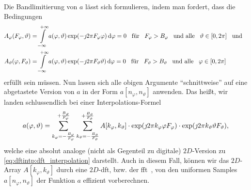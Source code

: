 Die Bandlimitierung von $a$ l\"asst sich formulieren, indem man fordert, dass die Bedingungen
\begin{align}
    A_{\varphi}(F_\varphi, \vartheta) 
    &= {\int\limits_{-\infty}^{+\infty}{
        a(\varphi, \vartheta) \exp(-\jmath 2 \pi F_\varphi \varphi)
    }\,\mathrm{d}{\varphi}} = 0 
    {\hspace{3mm} \text{f\"ur} \hspace{3mm}} F_\varphi > B_\varphi {\hspace{3mm} \text{und alle} \hspace{3mm}} \vartheta \in [0, 2 \pi] {\hspace{3mm} \text{und} \hspace{3mm}} \\
    A_{\vartheta}(\varphi, F_\vartheta) 
    &= {\int\limits_{-\infty}^{+\infty}{
        a(\varphi, \vartheta) \exp(-\jmath 2 \pi F_\vartheta \vartheta)
    }\,\mathrm{d}{\varphi}} = 0 
    {\hspace{3mm} \text{f\"ur} \hspace{3mm}} F_\vartheta > B_\vartheta {\hspace{3mm} \text{und alle} \hspace{3mm}} \varphi \in [0, 2 \pi]
\end{align}
erf\"ullt sein m\"ussen. Nun lassen sich alle obigen Argumente ``schnittweise'' auf eine abgetastete Version von $a$ in der Form $a[n_\varphi, n_\vartheta]$ anwenden. Das hei{\ss}t, wir landen schlussendlich bei einer Interpolations-Formel
\begin{equation}\label{2d_dft_interpolation}
    a(\varphi, \vartheta) = {\sum\limits_{k_\varphi=-\frac{B_\varphi}{F_\varphi}}^{+\frac{B_\varphi}{F_\varphi}}{
        {\sum\limits_{k_\vartheta=-\frac{B_\vartheta}{F_\vartheta}}^{+\frac{B_\vartheta}{F_\vartheta}}{
            A[k_\varphi, k_\vartheta] 
            \cdot \exp(\jmath 2 \pi k_\varphi \varphi F_\varphi)
            \cdot \exp(\jmath 2 \pi k_\vartheta \vartheta F_\vartheta)
        }}
    }},
\end{equation}
welche eine absolut analoge (nicht als Gegenteil zu digitale) $2D$-Version zu \eqref{eq:dftintp:dft_interpolation} darstellt. Auch in diesem Fall, k\"onnen wir das $2D$-Array $A[k_\varphi, k_\vartheta]$ durch eine $2D$-\gls{dft}, bzw. der \gls{fft}~\cite{FFTW05}, von den uniformen Samples $a[n_\varphi, n_\vartheta]$ der Funktion $a$ effizient vorberechnen.

